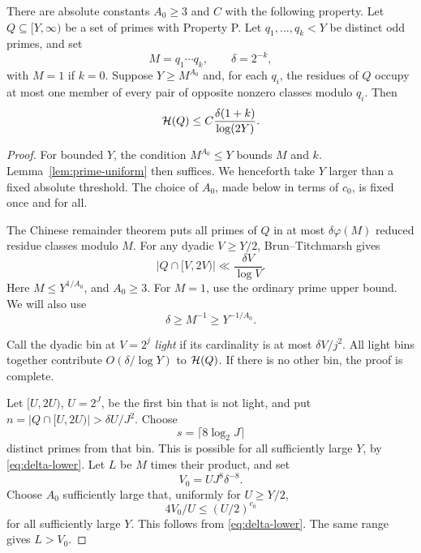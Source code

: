 \begin{lemma}\label{lem:prime-tail}
There are absolute constants \(A_0\ge3\) and \(C\) with the
following property. Let \(Q\subseteq[Y,\infty)\) be a set of
primes with Property P. Let \(q_1,\ldots,q_k<Y\) be distinct
odd primes, and set
\[
 M=q_1\cdots q_k,\qquad\delta=2^{-k},
\]
with \(M=1\) if \(k=0\). Suppose \(Y\ge M^{A_0}\) and,
for each \(q_i\), the residues of \(Q\) occupy at most one
member of every pair of opposite nonzero classes modulo \(q_i\).
Then
\begin{equation}\label{eq:prime-tail}
 \mathcal H(Q)\le C\frac{\delta(1+k)}{\log(2Y)}.
\end{equation}
\end{lemma}

\begin{proof}
For bounded \(Y\), the condition \(M^{A_0}\le Y\) bounds
\(M\) and \(k\). Lemma~\ref{lem:prime-uniform} then suffices.
We henceforth take \(Y\) larger than a fixed absolute threshold.
The choice of \(A_0\), made below in terms of \(c_0\), is fixed
once and for all.

The Chinese remainder theorem puts all primes of \(Q\) in at
most \(\delta\varphi(M)\) reduced residue classes modulo \(M\).
For any dyadic \(V\ge Y/2\), Brun--Titchmarsh gives
\begin{equation}\label{eq:bin-density}
 |Q\cap[V,2V)|\ll\frac{\delta V}{\log V}.
\end{equation}
Here \(M\le Y^{1/A_0}\), and \(A_0\ge3\).
For \(M=1\), use the ordinary prime upper bound.
We will also use
\begin{equation}\label{eq:delta-lower}
 \delta\ge M^{-1}\ge Y^{-1/A_0}.
\end{equation}

Call the dyadic bin at \(V=2^j\) \emph{light} if its
cardinality is at most \(\delta V/j^2\). All light bins
together contribute \(O(\delta/\log Y)\) to \(\mathcal H(Q)\).
If there is no other bin, the proof is complete.

Let \([U,2U)\), \(U=2^J\), be the first bin that is not
light, and put \(n=|Q\cap[U,2U)|>\delta U/J^2\).
Choose
\[
 s=\lceil8\log_2J\rceil
\]
distinct primes from that bin. This is possible for all
sufficiently large \(Y\), by \eqref{eq:delta-lower}.
Let \(L\) be \(M\) times their product, and set
\[
 V_0=U J^8\delta^{-8}.
\]
Choose \(A_0\) sufficiently large that, uniformly for
\(U\ge Y/2\),
\begin{equation}\label{eq:near-range}
 4V_0/U\le(U/2)^{c_0}
\end{equation}
for all sufficiently large \(Y\). This follows from
\eqref{eq:delta-lower}. The same range gives \(L>V_0\).


\end{proof}
